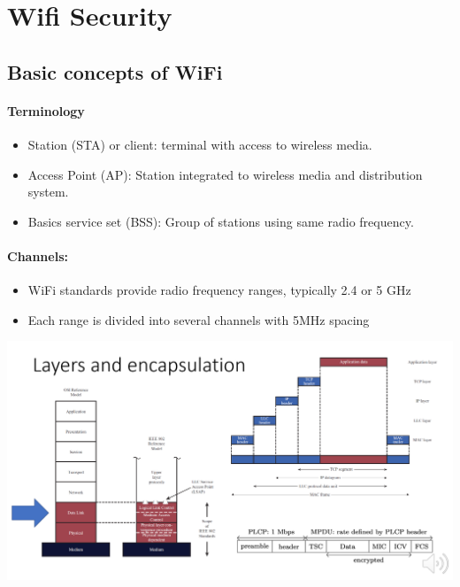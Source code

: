 \section{Wifi Security}

\subsection{Basic concepts of WiFi}
\paragraph{Terminology}
\begin{itemize}
    \item Station (STA) or client: terminal with access to wireless media.
    \item Access Point (AP): Station integrated to wireless media and distribution system.
    \item Basics service set (BSS): Group of stations using same radio frequency.
\end{itemize}

\paragraph{Channels:} 
\begin{itemize}
    \item WiFi standards provide radio frequency ranges, typically 2.4 or 5 GHz
    \item Each range is divided into several channels with 5MHz spacing
\end{itemize}

\begin{minipage}{\linewidth}
    \centering      
    \includegraphics[width=\linewidth]{Figures/L9_layers.PNG}
\end{minipage}

